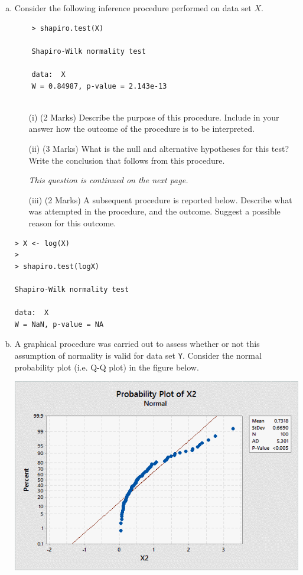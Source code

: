 \documentclass[a4paper,12pt]{article}
\begin{document}
\begin{enumerate}
\begin{enumerate}[(a)]
\item 
Consider the following inference procedure performed on data set $X$.
\begin{framed}
	\begin{verbatim}
	> shapiro.test(X)
	
	Shapiro-Wilk normality test
	
	data:  X
	W = 0.84987, p-value = 2.143e-13
	
	\end{verbatim}
\end{framed}


\begin{itemize}
	\item[(i)] (2 Marks) Describe the purpose of this procedure. Include in your answer how the outcome of the procedure is to be interpreted.
	\item[(ii)] (3 Marks) What is the null and alternative hypotheses for this test? Write the conclusion that follows from this procedure.
\medskip


\noindent \textit{This question is continued on the next page.}
	
\newpage	
\item[(iii)] (2 Marks) A subsequent procedure is reported below. Describe what was attempted in the procedure, and the outcome. Suggest a possible reason for this outcome.
\end{itemize}

\begin{framed}
\begin{verbatim}
> X <- log(X)
>
> shapiro.test(logX)
	
Shapiro-Wilk normality test
	
data:  X
W = NaN, p-value = NA
\end{verbatim}
\end{framed}




\item A graphical procedure was carried out to assess whether or not this assumption of normality is valid for data set \texttt{Y}. Consider the normal probability plot (i.e. Q-Q plot) in the figure below.

\begin{center}
	\includegraphics[scale=0.80]{Q5examQQplot3.png}
\end{center}


\end{enumerate}
\end{enumerate}
\end{document}
